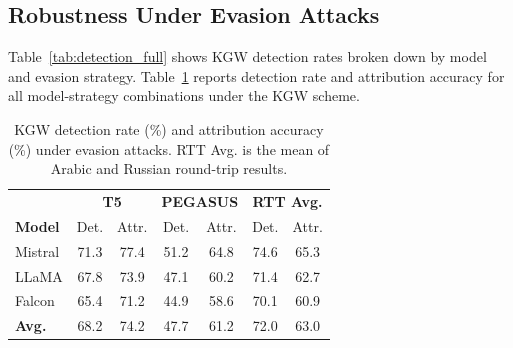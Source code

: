 \documentclass[11pt]{article}
\begin{document}
\begin{table}[t]
\centering
\small
{}
\caption{Baseline detection and attribution results (no evasion). Rate = detection rate; Attr.\ = attribution accuracy; Avg.\ Score is the KGW $z$-score or Aaronson mean score.}
\label{tab:baseline}
\end{table}

\subsection{Robustness Under Evasion Attacks}

Table~\ref{tab:detection_full} shows KGW detection rates broken down by model
and evasion strategy.
Table~\ref{tab:evasion} reports detection rate and attribution accuracy for
all model-strategy combinations under the KGW scheme.

\begin{table}[t]
\centering
\small
\setlength{\tabcolsep}{4pt}
\begin{tabular}{@{}lcccccc@{}}
\toprule
 & \multicolumn{2}{c}{\textbf{T5}} & \multicolumn{2}{c}{\textbf{PEGASUS}} & \multicolumn{2}{c}{\textbf{RTT Avg.}} \\
\cmidrule(lr){2-3}\cmidrule(lr){4-5}\cmidrule(lr){6-7}
\textbf{Model} & Det. & Attr. & Det. & Attr. & Det. & Attr. \\
\midrule
Mistral & 71.3 & 77.4 & 51.2 & 64.8 & 74.6 & 65.3 \\
LLaMA   & 67.8 & 73.9 & 47.1 & 60.2 & 71.4 & 62.7 \\
Falcon  & 65.4 & 71.2 & 44.9 & 58.6 & 70.1 & 60.9 \\
\midrule
\textbf{Avg.} & 68.2 & 74.2 & 47.7 & 61.2 & 72.0 & 63.0 \\
\bottomrule
\end{tabular}
\caption{KGW detection rate (\%) and attribution accuracy (\%) under evasion attacks. RTT Avg. is the mean of Arabic and Russian round-trip results.}
\label{tab:evasion}
\end{table}
\end{document}
